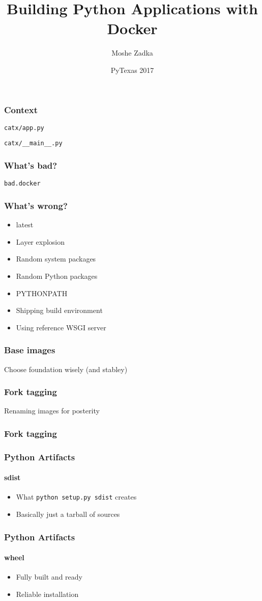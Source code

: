 \documentclass{beamer}
\title{Building Python Applications with Docker}
\author{Moshe Zadka}
\date{PyTexas 2017}
\begin{document}
 
\frame{\titlepage}

\begin{frame}[fragile]
\frametitle{Context}
\verb|catx/app.py|

\verb|catx/__main__.py|

\end{frame}

\begin{frame}[fragile]
\frametitle{What's bad?}
\verb|bad.docker|

\end{frame}

\begin{frame}[fragile]
\frametitle{What's wrong?}
\begin{itemize}
\item latest \pause
\item Layer explosion \pause
\item Random system packages \pause
\item Random Python packages \pause
\item PYTHONPATH \pause
\item Shipping build environment \pause
\item Using reference WSGI server
\end{itemize}
\end{frame}

\begin{frame}
\frametitle{Base images}
Choose foundation wisely (and stabley)
\end{frame}

\begin{frame}
\frametitle{Fork tagging}
Renaming images for posterity
\end{frame}

\begin{frame}[fragile]
\frametitle{Fork tagging}

\end{frame}

\begin{frame}[fragile]
\frametitle{Python Artifacts}
\framesubtitle{sdist}
\begin{itemize}
\item What \verb|python setup.py sdist| creates
\item Basically just a tarball of sources
\end{itemize}
\end{frame}

\begin{frame}[fragile]
\frametitle{Python Artifacts}
\framesubtitle{wheel}
\begin{itemize}
\item Fully built and ready
\item Reliable installation
\end{itemize}
\end{frame}
\end{document}
